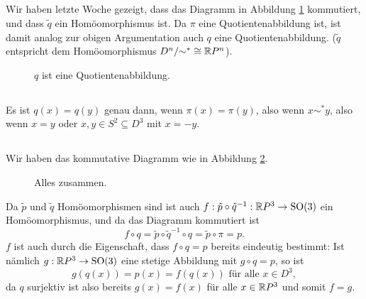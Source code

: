 \documentclass[a4paper,10pt]{article}
\begin{document}
\subsection{}
Wir haben letzte Woche gezeigt, dass das Diagramm in Abbildung \ref{fig: q Quotientenabbildung} kommutiert, und dass $\tilde{q}$ ein Homöomorphismus ist. Da $\pi$ eine Quotientenabbildung ist, ist damit analog zur obigen Argumentation auch $q$ eine Quotientenabbildung. ($\tilde{q}$ entspricht dem Homöomorphismus $D^n/{\sim^*} \cong \mathbb{R} P^n$).
\begin{figure}\centering
 \caption{$q$ ist eine Quotientenabbildung.}
 \label{fig: q Quotientenabbildung}
\end{figure}


\subsection{}
Es ist $q(x) = q(y)$ genau dann, wenn $\pi(x) = \pi(y)$, also wenn $x \sim^* y$, also wenn $x = y$ oder $x,y \in S^2 \subseteq D^3$ mit $x = -y$.


\subsection{}
Wir haben das kommutative Diagramm wie in Abbildung \ref{fig: alles zusammen}.
\begin{figure}\centering
 \caption{Alles zusammen.}
 \label{fig: alles zusammen}
\end{figure}
Da $\tilde{p}$ und $\tilde{q}$ Homöomorphismen sind ist auch $f : \tilde{p} \circ \tilde{q}^{-1} : \mathbb{R} P^3 \to \operatorname{SO}(3)$ ein Homöomorphismus, und da das Diagramm kommutiert ist
\[
 f \circ q
 = \tilde{p} \circ \tilde{q}^{-1} \circ q
 = \tilde{p} \circ \pi
 = p.
\]
$f$ ist auch durch die Eigenschaft, dass $f \circ q = p$ bereits eindeutig bestimmt: Ist nämlich $g : \mathbb{R} P^3 \to \operatorname{SO}(3)$ eine stetige Abbildung mit $g \circ q = p$, so ist
\[
 g(q(x)) = p(x) = f(q(x)) \text{ für alle } x \in D^3,
\]
da $q$ surjektiv ist also bereits $g(x) = f(x)$ für alle $x \in \mathbb{R} P^3$ und somit $f = g$.
\end{document}
